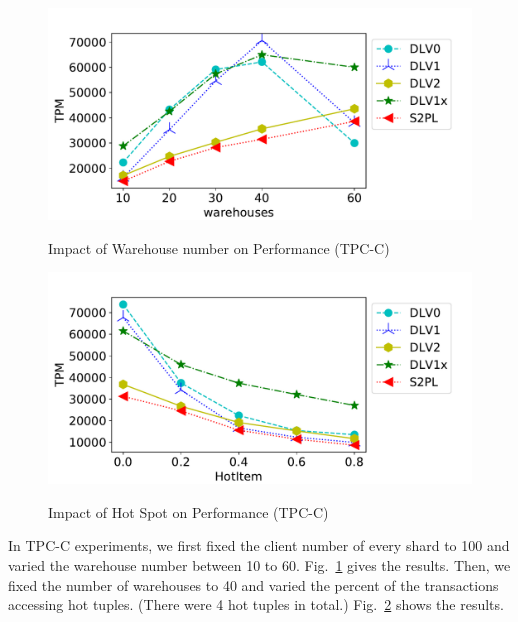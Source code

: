 \documentclass[conference]{IEEEtran}
\begin{document}
\begin{figure}[tbp]
  \centering
      { \includegraphics[scale=0.35] {figure/plot_tpcc_neworder_add_Warehouse_Warehouse_TPM_gather} \label{fig:plot_tpcc_neworder_add_Warehouse_Warehouse_gather:tpm}}
\caption{Impact of Warehouse number on Performance (TPC-C)}
\label{fig:plot_tpcc_neworder_add_Warehouse_Warehouse_gather}
\end{figure}

\begin{figure}[tbp]
  \centering
      { \includegraphics[scale=0.35] {figure/plot_tpcc_neworder_add_HotItem_HotItem_TPM_gather} \label{fig:plot_tpcc_neworder_add_HotItem_HotItem_gather:tpm}}
\caption{Impact of Hot Spot on Performance (TPC-C)}
\label{fig:plot_tpcc_neworder_add_HotItem_HotItem_gather}
\end{figure}

In TPC-C experiments, we first fixed the client number of every shard to 100 and varied the warehouse number between 10 to 60.
Fig.~\ref{fig:plot_tpcc_neworder_add_Warehouse_Warehouse_gather} gives the results.
Then, we fixed the number of warehouses to 40 and varied the percent of the transactions accessing hot tuples. (There were 4 hot tuples in total.)
Fig.~\ref{fig:plot_tpcc_neworder_add_HotItem_HotItem_gather} shows the results.
\end{document}

